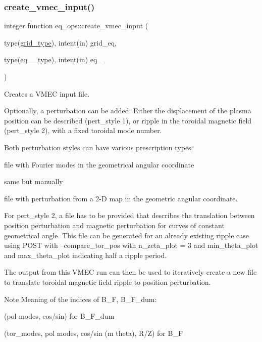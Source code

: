 \subsubsection{\texorpdfstring{create\+\_\+vmec\+\_\+input()}{create\_vmec\_input()}}
{\footnotesize\ttfamily integer function eq\+\_\+ops\+::create\+\_\+vmec\+\_\+input (\begin{DoxyParamCaption}\item[{type(\hyperlink{structgrid__vars_1_1grid__type}{grid\+\_\+type}), intent(in)}]{grid\+\_\+eq,  }\item[{type(\hyperlink{structeq__vars_1_1eq__1__type}{eq\+\_\+1\+\_\+type}), intent(in)}]{eq\+\_ }\end{DoxyParamCaption})}



Creates a V\+M\+EC input file. 

Optionally, a perturbation can be added\+: Either the displacement of the plasma position can be described ({\ttfamily pert\+\_\+style} 1), or ripple in the toroidal magnetic field ({\ttfamily pert\+\_\+style} 2), with a fixed toroidal mode number.

Both perturbation styles can have various prescription types\+:
\begin{DoxyEnumerate}
\item file with Fourier modes in the geometrical angular coordinate
\item same but manually
\item file with perturbation from a 2-\/D map in the geometric angular coordinate.
\end{DoxyEnumerate}

For {\ttfamily pert\+\_\+style} 2, a file has to be provided that describes the translation between position perturbation and magnetic perturbation for curves of constant geometrical angle. This file can be generated for an already existing ripple case using P\+O\+ST with {\ttfamily --compare\+\_\+tor\+\_\+pos} with {\ttfamily n\+\_\+zeta\+\_\+plot = 3} and {\ttfamily min\+\_\+theta\+\_\+plot} and {\ttfamily max\+\_\+theta\+\_\+plot} indicating half a ripple period.

The output from this V\+M\+EC run can then be used to iteratively create a new file to translate toroidal magnetic field ripple to position perturbation.

\begin{DoxyNote}{Note}
Meaning of the indices of {\ttfamily B\+\_\+F}, {\ttfamily B\+\_\+\+F\+\_\+dum\+:} 
\begin{DoxyItemize}
\item {\ttfamily (pol modes, cos/sin)} for {\ttfamily B\+\_\+\+F\+\_\+dum} 
\item {\ttfamily (tor\+\_\+modes, pol modes, cos/sin (m theta), R/Z)} for {\ttfamily B\+\_\+F} 
\end{DoxyItemize}
\end{DoxyNote}

